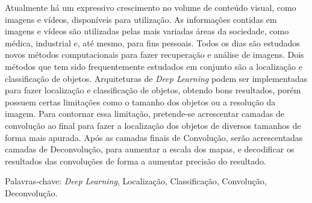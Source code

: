 \begin{resumo}
\vspace{-1cm}

\onehalfspacing

\noindent 
   Atualmente há um expressivo crescimento no volume de conteúdo visual, como imagens e vídeos, disponíveis para utilização. As informações contidas em imagens e vídeos são utilizadas pelas mais variadas áreas da sociedade, como médica, industrial e, até mesmo, para fins pessoais. Todos os dias são estudados novos métodos computacionais para fazer recuperação e análise de imagens. Dois métodos que tem sido frequentemente estudados em conjunto são a localização e classificação de objetos. Arquiteturas de \textit{Deep Learning} podem ser implementadas para fazer localização e classificação de objetos, obtendo bons resultados, porém possuem certas limitações como o tamanho dos objetos ou a resolução da imagem. Para contornar essa limitação, pretende-se acrescentar camadas de convolução ao final para fazer a localização dos objetos de diversos tamanhos de forma mais apurada. Após as camadas finais de Convolução, serão acrescentadas camadas de Deconvolução, para aumentar a escala dos mapas, e decodificar os resultados das convoluções de forma a aumentar  precisão do resultado.

\vspace*{.75cm}

\noindent Palavras-chave: \textit{Deep Learning}, Localização, Classificação, Convolução, Deconvolução.\\

\end{resumo}